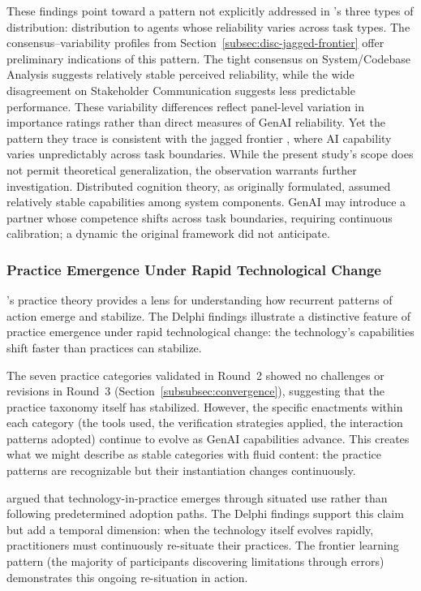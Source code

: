 These findings point toward a pattern not explicitly addressed in
\textcite{hollan_distributed_2000}'s three types of distribution: distribution
to agents whose reliability varies across task types. The consensus--variability
profiles from Section~\ref{subsec:disc-jagged-frontier} offer preliminary
indications of this pattern. The tight consensus on System/Codebase Analysis suggests relatively stable
perceived reliability, while the wide disagreement on Stakeholder Communication
suggests less predictable performance. These variability differences reflect
panel-level variation in importance ratings rather than direct measures of
GenAI reliability. Yet the
pattern they trace is consistent with the jagged frontier
\parencite{dellacqua_navigating_2023}, where AI capability varies
unpredictably across task boundaries. While the present study's scope does not
permit theoretical generalization, the observation warrants further
investigation. Distributed cognition theory, as originally formulated, assumed
relatively stable capabilities among system components. GenAI may introduce a
partner whose competence shifts across task boundaries, requiring continuous
calibration; a dynamic the original framework did not anticipate.

\subsubsection{Practice Emergence Under Rapid Technological Change}

\textcite{feldman_theorizing_2011}'s practice theory provides a lens for
understanding how recurrent patterns of action emerge and stabilize. The Delphi
findings illustrate a distinctive feature of practice emergence under rapid
technological change: the technology's capabilities shift faster than practices
can stabilize.

The seven practice categories validated in Round~2 showed no challenges or
revisions in Round~3 (Section~\ref{subsubsec:convergence}), suggesting that
the practice taxonomy itself has stabilized. However, the specific
enactments within each category (the tools used, the verification strategies
applied, the interaction patterns adopted) continue to evolve as GenAI
capabilities advance. This creates what we might describe as stable categories
with fluid content: the practice patterns are recognizable but their
instantiation changes continuously.

\textcite{orlikowski_using_2000} argued that technology-in-practice emerges
through situated use rather than following predetermined adoption paths.
The Delphi findings support this claim but add a temporal dimension: when
the technology itself evolves rapidly, practitioners must continuously
re-situate their practices. The frontier learning pattern (the majority of participants discovering
limitations through errors) demonstrates this ongoing re-situation in action.

